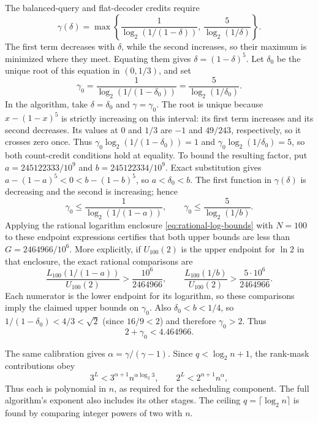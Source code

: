 \begin{parameterchoice}
The balanced-query and flat-decoder credits require
\[
 \gamma(\delta)=\max\left\{
 \frac1{\log_2(1/(1-\delta))},\,
 \frac5{\log_2(1/\delta)}\right\}.
\]
The first term decreases with $\delta$, while the second increases,
so their maximum is minimized where they meet. Equating them gives
$\delta=(1-\delta)^5$. Let $\delta_0$ be the
unique root of this equation in $(0,1/3)$, and set
\[
 \gamma_0=\frac1{\log_2(1/(1-\delta_0))}
         =\frac5{\log_2(1/\delta_0)}.
\]
In the algorithm, take $\delta=\delta_0$ and $\gamma=\gamma_0$.
The root is unique because $x-(1-x)^5$ is strictly increasing on this
interval: its first term increases and its second decreases. Its values
at $0$ and $1/3$ are $-1$ and $49/243$, respectively, so it crosses
zero once. Thus
$\gamma_0\log_2(1/(1-\delta_0))=1$ and
$\gamma_0\log_2(1/\delta_0)=5$, so both count-credit conditions hold
at equality. To bound the resulting factor,
put $a=245122333/10^9$ and $b=245122334/10^9$. Exact substitution gives
$a-(1-a)^5<0<b-(1-b)^5$, so $a<\delta_0<b$. The first function in
$\gamma(\delta)$ is decreasing and the second is increasing; hence
\[
 \gamma_0\le\frac1{\log_2(1/(1-a))},\qquad
 \gamma_0\le\frac5{\log_2(1/b)}.
\]
Applying the rational logarithm enclosure
\eqref{eq:rational-log-bounds} with $N=100$ to these endpoint
expressions certifies that both upper bounds are less than
$G=2464966/10^6$. More explicitly, if $U_{100}(2)$ is the upper
endpoint for $\ln2$ in that enclosure, the exact rational comparisons
are
\[
 \frac{L_{100}(1/(1-a))}{U_{100}(2)}>\frac{10^6}{2464966},
 \qquad
 \frac{L_{100}(1/b)}{U_{100}(2)}>\frac{5\cdot10^6}{2464966}.
\]
Each numerator is the lower endpoint for its logarithm, so these
comparisons imply the claimed upper bounds on $\gamma_0$. Also
$\delta_0<b<1/4$, so
$1/(1-\delta_0)<4/3<\sqrt2$ (since $16/9<2$) and therefore
$\gamma_0>2$. Thus
\[
 \boxed{2+\gamma_0<4.464966.}
\]
\end{parameterchoice}

The same calibration gives
$\alpha=\gamma/(\gamma-1)$.
Since $q<\log_2n+1$, the rank-mask contributions obey
\[
 3^L<3^{\alpha+1}n^{\alpha\log_2 3},\qquad
 2^L<2^{\alpha+1}n^\alpha,
\]
Thus each is polynomial in $n$, as required for the scheduling
component. The full algorithm's exponent also includes its other stages.
The ceiling $q=\lceil\log_2 n\rceil$ is found by comparing integer
powers of two with $n$.

